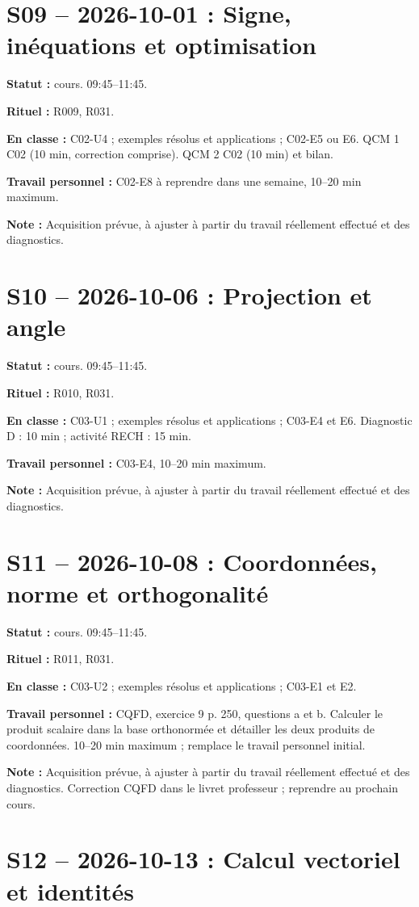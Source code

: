 \section*{S09 -- 2026-10-01 : Signe, inéquations et optimisation}
\textbf{Statut :} cours. 09:45–11:45.\par\textbf{Rituel :} R009, R031.\par\textbf{En classe :} C02-U4 ; exemples résolus et applications ; C02-E5 ou E6.  QCM 1 C02 (10 min, correction comprise). QCM 2 C02 (10 min) et bilan.\par\textbf{Travail personnel :} C02-E8 à reprendre dans une semaine, 10–20 min maximum.\par\textbf{Note :} Acquisition prévue, à ajuster à partir du travail réellement effectué et des diagnostics.
\section*{S10 -- 2026-10-06 : Projection et angle}
\textbf{Statut :} cours. 09:45–11:45.\par\textbf{Rituel :} R010, R031.\par\textbf{En classe :} C03-U1 ; exemples résolus et applications ; C03-E4 et E6. Diagnostic D : 10 min ; activité RECH : 15 min.\par\textbf{Travail personnel :} C03-E4, 10–20 min maximum.\par\textbf{Note :} Acquisition prévue, à ajuster à partir du travail réellement effectué et des diagnostics.
\section*{S11 -- 2026-10-08 : Coordonnées, norme et orthogonalité}
\textbf{Statut :} cours. 09:45–11:45.\par\textbf{Rituel :} R011, R031.\par\textbf{En classe :} C03-U2 ; exemples résolus et applications ; C03-E1 et E2. \par\textbf{Travail personnel :} CQFD, exercice 9 p. 250, questions a et b. Calculer le produit scalaire dans la base orthonormée et détailler les deux produits de coordonnées. 10–20 min maximum ; remplace le travail personnel initial.\par\textbf{Note :} Acquisition prévue, à ajuster à partir du travail réellement effectué et des diagnostics. Correction CQFD dans le livret professeur ; reprendre au prochain cours.
\section*{S12 -- 2026-10-13 : Calcul vectoriel et identités}
